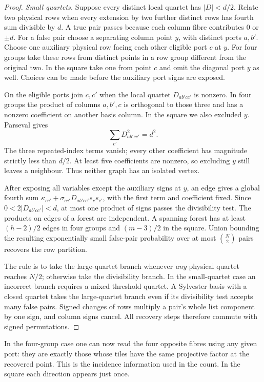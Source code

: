 \documentclass[11pt,reqno]{amsart}
\theoremstyle{remark}\newtheorem{remark}[theorem]{Remark}
\begin{document}
\begin{proof}
\emph{Small quartets.} Suppose every distinct local quartet has \(|D|<d/2\). Relate two physical rows when every extension by two further distinct rows has fourth sum divisible by \(d\). A true pair passes because each column fibre contributes \(0\) or \(\pm d\). For a false pair choose a separating column point \(y\), with distinct ports \(a,b'\). Choose one auxiliary physical row facing each other eligible port \(c\) at \(y\). For four groups take these rows from distinct points in a row group different from the original two. In the square take one from point \(c\) and omit the diagonal port \(y\) as well. Choices can be made before the auxiliary port signs are exposed.

On the eligible ports join \(c,c'\) when the local quartet \(D_{ab'cc'}\) is nonzero. In four groups the product of columns \(a,b',c\) is orthogonal to those three and has a nonzero coefficient on another basis column. In the square we also excluded \(y\). Parseval gives
\[
 \sum_{c'} D_{ab'cc'}^2=d^2.
\]
The three repeated-index terms vanish; every other coefficient has magnitude strictly less than \(d/2\). At least five coefficients are nonzero, so excluding \(y\) still leaves a neighbour. Thus neither graph has an isolated vertex.

After exposing all variables except the auxiliary signs at \(y\), an edge gives a global fourth sum \(\kappa_{cc'}+\sigma_{cc'}D_{ab'cc'}s_cs_{c'}\), with the first term and coefficient fixed. Since \(0<2|D_{ab'cc'}|<d\), at most one product of signs passes the divisibility test. The products on edges of a forest are independent. A spanning forest has at least \((h-2)/2\) edges in four groups and \((m-3)/2\) in the square. Union bounding the resulting exponentially small false-pair probability over at most \(\binom N2\) pairs recovers the row partition.

The rule is to take the large-quartet branch whenever \emph{any} physical quartet reaches \(N/2\); otherwise take the divisibility branch. In the small-quartet case an incorrect branch requires a mixed threshold quartet. A Sylvester basis with a closed quartet takes the large-quartet branch even if its divisibility test accepts many false pairs. Signed changes of rows multiply a pair's whole list component by one sign, and column signs cancel. All recovery steps therefore commute with signed permutations.
\end{proof}

In the four-group case one can now read the four opposite fibres using any given port: they are exactly those whose tiles have the same projective factor at the recovered point. This is the incidence information used in the count. In the square each direction appears just once.
\end{document}
